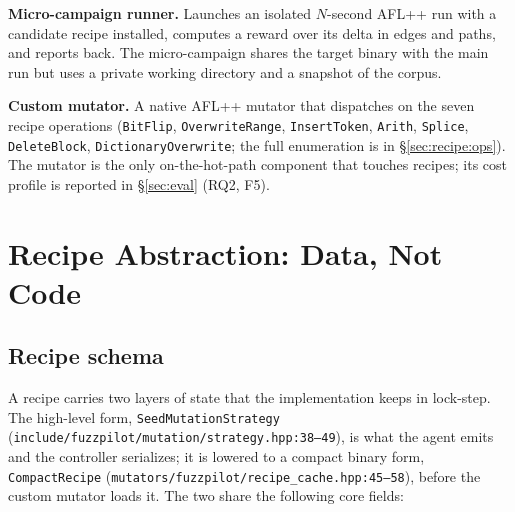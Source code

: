 \documentclass[11pt]{article}
\begin{document}
\textbf{Micro-campaign runner.} Launches an isolated $N$-second
AFL++ run with a candidate recipe installed, computes a reward over
its delta in edges and paths, and reports back. The micro-campaign
shares the target binary with the main run but uses a private
working directory and a snapshot of the corpus.

\textbf{Custom mutator.} A native AFL++ mutator that dispatches on
the seven recipe operations (\texttt{BitFlip},
\texttt{OverwriteRange}, \texttt{InsertToken}, \texttt{Arith},
\texttt{Splice}, \texttt{DeleteBlock}, \texttt{DictionaryOverwrite};
the full enumeration is in \S\ref{sec:recipe:ops}). The mutator
is the only on-the-hot-path component
that touches recipes; its cost profile is reported in
\S\ref{sec:eval} (RQ2, F5).

\section{Recipe Abstraction: Data, Not Code}
\label{sec:recipe}

\subsection{Recipe schema}
\label{sec:recipe:schema}

A recipe carries two layers of state that the implementation keeps
in lock-step. The high-level form,
\texttt{SeedMutationStrategy}
(\texttt{include/fuzzpilot/mutation/strategy.hpp:38--49}), is what
the agent emits and the controller serializes; it is lowered to a
compact binary form, \texttt{CompactRecipe}
(\texttt{mutators/fuzzpilot/recipe\_cache.hpp:45--58}), before the
custom mutator loads it. The two share the following core fields:
\end{document}
